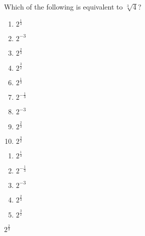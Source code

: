 

  Which of the following is equivalent to $\sqrt[3]{4}$?


\ifsat
	\begin{enumerate}[label=\Alph*)]
		\item   $2^\frac{1}{3}$  
		\item  $2^{-3}$
		\item  $2^\frac{2}{3}$ %
		\item  $2^\frac{3}{2}$
	\end{enumerate}
\else
\fi

\ifacteven
	\begin{enumerate}[label=\textbf{\Alph*.},itemsep=\fill,align=left]
		\setcounter{enumii}{5}
		\item   $2^\frac{1}{3}$  
		\item   $2^{-\frac{1}{3}}$
		\item  $2^{-3}$
		\addtocounter{enumii}{1}
		\item  $2^\frac{2}{3}$ %
		\item  $2^\frac{3}{2}$
	\end{enumerate}
\else
\fi

\ifactodd
	\begin{enumerate}[label=\textbf{\Alph*.},itemsep=\fill,align=left]
		\item   $2^\frac{1}{3}$  
		\item   $2^{-\frac{1}{3}}$
		\item  $2^{-3}$
		\item  $2^\frac{2}{3}$ %
		\item  $2^\frac{3}{2}$
	\end{enumerate}
\else
\fi

\ifgridin
  $2^\frac{2}{3}$ %
		
\else
\fi

